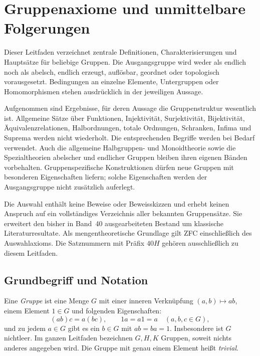 \chapter{Gruppenaxiome und unmittelbare Folgerungen}

Dieser Leitfaden verzeichnet zentrale Definitionen, Charakterisierungen und
Hauptsätze für beliebige Gruppen. Die Ausgangsgruppe wird weder als endlich
noch als abelsch, endlich erzeugt, auflösbar, geordnet oder topologisch
vorausgesetzt. Bedingungen an einzelne Elemente, Untergruppen oder
Homomorphismen stehen ausdrücklich in der jeweiligen Aussage.

Aufgenommen sind Ergebnisse, für deren Aussage die Gruppenstruktur
wesentlich ist. Allgemeine Sätze über Funktionen, Injektivität,
Surjektivität, Bijektivität, Äquivalenzrelationen, Halbordnungen,
totale Ordnungen, Schranken, Infima und Suprema werden nicht wiederholt.
Die entsprechenden Begriffe werden bei Bedarf verwendet. Auch die
allgemeine Halbgruppen- und Monoidtheorie sowie die Spezialtheorien
abelscher und endlicher Gruppen bleiben ihren eigenen Bänden vorbehalten.
Gruppenspezifische Konstruktionen dürfen neue Gruppen mit besonderen
Eigenschaften liefern; solche Eigenschaften werden der Ausgangsgruppe
nicht zusätzlich auferlegt.

Die Auswahl enthält keine Beweise oder Beweisskizzen und erhebt keinen
Anspruch auf ein vollständiges Verzeichnis aller bekannten Gruppensätze.
Sie erweitert den bisher in Band~40 ausgearbeiteten Bestand um klassische
Literaturresultate. Als mengentheoretische Grundlage gilt ZFC einschließlich
des Auswahlaxioms. Die Satznummern mit Präfix \(40H\) gehören ausschließlich
zu diesem Leitfaden.

\section{Grundbegriff und Notation}

\begin{definition}[Gruppe]
Eine \emph{Gruppe} ist eine Menge \(G\) mit einer inneren Verknüpfung
\((a,b)\mapsto ab\), einem Element \(1\in G\) und folgenden Eigenschaften:
\[
 (ab)c=a(bc),\qquad 1a=a1=a
 \quad(a,b,c\in G),
\]
und zu jedem \(a\in G\) gibt es ein \(b\in G\) mit \(ab=ba=1\).
Insbesondere ist \(G\) nichtleer. Im ganzen Leitfaden bezeichnen
\(G,H,K\) Gruppen, soweit nichts anderes angegeben wird.
Die Gruppe mit genau einem Element heißt \emph{trivial}.
\end{definition}

